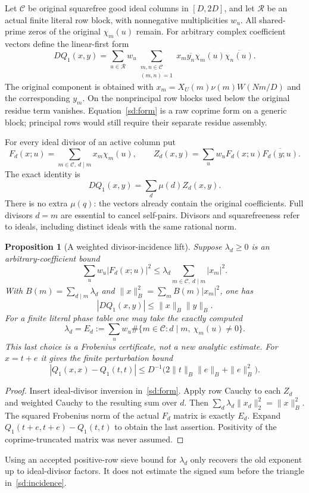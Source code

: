 \documentclass[11pt]{article}
\newtheorem{proposition}[theorem]{Proposition}
\theoremstyle{definition}\newtheorem{definition}[theorem]{Definition}
\theoremstyle{remark}\newtheorem{remark}[theorem]{Remark}
\begin{document}
Let $\mathcal C$ be original squarefree good ideal columns in $[D,2D]$,
and let $\mathcal R$ be an actual finite literal row block, with
nonnegative multiplicities $w_u$. All shared-prime zeros of the original
$\chi_m(u)$ remain. For arbitrary complex coefficient vectors define the
linear-first form
\begin{equation}\label{sd:form}
 DQ_1(x,y)=\sum_{u\in\mathcal R}w_u
 \sum_{\substack{m,n\in\mathcal C\\(m,n)=1}}
 x_m\overline{y_n}\chi_m(u)\overline{\chi_n(u)}.
\end{equation}
The original component is obtained with
$x_m=X_U(m)\nu(m)W(Nm/D)$ and the corresponding $y_m$.
On the nonprincipal row blocks used below the original residue term
vanishes. Equation~\eqref{sd:form} is a raw coprime form on a generic
block; principal rows would still require their separate residue assembly.

For every ideal divisor of an active column put
\[
 F_d(x;u)=\sum_{m\in\mathcal C,\ d\mid m}x_m\chi_m(u),\qquad
 Z_d(x,y)=\sum_u w_uF_d(x;u)\overline{F_d(y;u)}.
\]
The exact identity is
\begin{equation}\label{sd:incidence}
 DQ_1(x,y)=\sum_d\mu(d)Z_d(x,y).
\end{equation}
There is no extra $\mu(q)$: the vectors already contain the original
coefficients. Full divisors $d=m$ are essential to cancel self-pairs.
Divisors and squarefreeness refer to ideals, including distinct ideals
with the same rational norm.

\begin{proposition}[A weighted divisor-incidence lift]\label{sd:lift}
Suppose $\lambda_d\ge0$ is an arbitrary-coefficient bound
\[
 \sum_u w_u|F_d(x;u)|^2\le\lambda_d
                 \sum_{m\in\mathcal C,\ d\mid m}|x_m|^2.
\]
With $B(m)=\sum_{d\mid m}\lambda_d$ and
$\|x\|_B^2=\sum_mB(m)|x_m|^2$, one has
\begin{equation}\label{sd:weighted}
 |DQ_1(x,y)|\le\|x\|_B\|y\|_B.
\end{equation}
For a finite literal phase table one may take the exactly computed
\[
 \lambda_d=E_d:=\sum_u w_u\#\{m\in\mathcal C:d\mid m,\ \chi_m(u)\ne0\}.
\]
This last choice is a Frobenius certificate, not a new analytic estimate.
For $x=t+e$ it gives the finite perturbation bound
\begin{equation}\label{sd:certificate}
 |Q_1(x,x)-Q_1(t,t)|\le
 D^{-1}\bigl(2\|t\|_B\|e\|_B+\|e\|_B^2\bigr).
\end{equation}
\end{proposition}
\begin{proof}
Insert ideal-divisor inversion in~\eqref{sd:form}. Apply row Cauchy to
each $Z_d$ and weighted Cauchy to the resulting sum over $d$.
Then $\sum_d\lambda_d\|x_d\|_2^2=\|x\|_B^2$.
The squared Frobenius norm of the actual $F_d$ matrix is exactly $E_d$.
Expand $Q_1(t+e,t+e)-Q_1(t,t)$ to obtain the last assertion.
Positivity of the coprime-truncated matrix was never assumed.
\end{proof}
Using an accepted positive-row sieve bound for $\lambda_d$ only recovers
the old exponent up to ideal-divisor factors. It does not estimate the
signed sum before the triangle in~\eqref{sd:incidence}.
\end{document}
